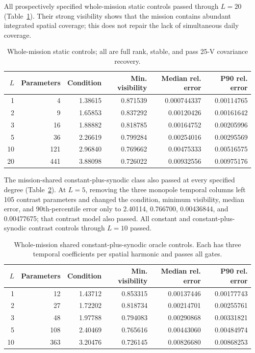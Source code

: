 \documentclass[11pt]{article}
\begin{document}
All prospectively specified whole-mission static controls passed through
$L=20$ (Table~\ref{tab:static}).  Their strong visibility shows that the
mission contains abundant integrated spatial coverage; this does not repair
the lack of simultaneous daily coverage.

\begin{table}[ht]
\centering
\caption{Whole-mission static controls; all are full rank, stable, and pass
25-V covariance recovery.}
\label{tab:static}
\begin{tabular}{rrrrrr}
\toprule
$L$ & Parameters & Condition & Min. visibility & Median rel. error & P90 rel. error \\
\midrule
1  & 4   & 1.38615 & 0.871539 & 0.000744337 & 0.00114765 \\
2  & 9   & 1.65853 & 0.837292 & 0.00120426  & 0.00161642 \\
3  & 16  & 1.88882 & 0.818785 & 0.00164752  & 0.00205996 \\
5  & 36  & 2.26619 & 0.799284 & 0.00254016  & 0.00295569 \\
10 & 121 & 2.96840 & 0.769662 & 0.00475333  & 0.00516575 \\
20 & 441 & 3.88098 & 0.726022 & 0.00932556  & 0.00975176 \\
\bottomrule
\end{tabular}
\end{table}

The mission-shared constant-plus-synodic class also passed at every specified
degree (Table~\ref{tab:synodic}).  At $L=5$, removing the three monopole
temporal columns left 105 contrast parameters and changed the condition,
minimum visibility, median error, and 90th-percentile error only to 2.40114,
0.766700, 0.00436844, and 0.00477675; that contrast model also passed.  All
constant and constant-plus-synodic contrast controls through $L=10$ passed.

\begin{table}[ht]
\centering
\caption{Whole-mission shared constant-plus-synodic oracle controls.  Each has
three temporal coefficients per spatial harmonic and passes all gates.}
\label{tab:synodic}
\begin{tabular}{rrrrrr}
\toprule
$L$ & Parameters & Condition & Min. visibility & Median rel. error & P90 rel. error \\
\midrule
1  & 12  & 1.43712 & 0.853315 & 0.00137446 & 0.00177743 \\
2  & 27  & 1.72202 & 0.818734 & 0.00214701 & 0.00255761 \\
3  & 48  & 1.97788 & 0.794083 & 0.00290868 & 0.00331821 \\
5  & 108 & 2.40469 & 0.765616 & 0.00443060 & 0.00484974 \\
10 & 363 & 3.20476 & 0.726145 & 0.00826680 & 0.00868253 \\
\bottomrule
\end{tabular}
\end{table}
\end{document}
